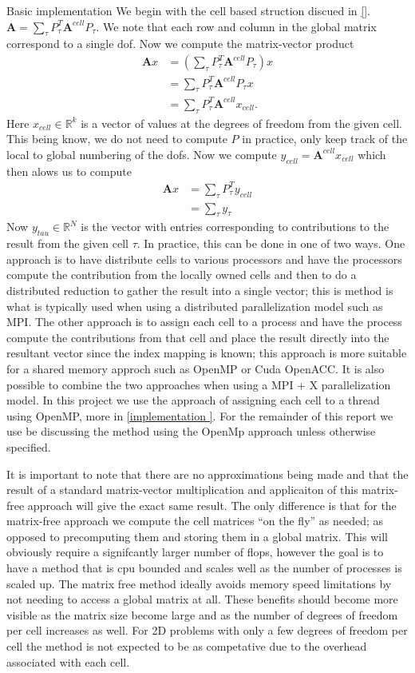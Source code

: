 \documentclass[12pt]{article}
\begin{document}
Basic implementation
We begin with the cell based struction discued in \ref{}. $ \mathbf{A} = \sum_{\tau}P^{T}_{\tau}\mathbf{A}^{cell}P_{\tau} $. We note that each row and column in the global matrix correspond to a single dof. Now we compute the matrix-vector product
\begin{align*}
\mathbf{A}x &= \left(\sum_{\tau}P^{T}_{\tau}\mathbf{A}^{cell}P_{\tau} \right)x \\
				&= \sum_{\tau}P^{T}_{\tau}\mathbf{A}^{cell}P_{\tau}x \\
				&= \sum_{\tau}P^{T}_{\tau}\mathbf{A}^{cell}x_{cell}.
\end{align*}
Here $x_{cell} \in \mathbb{R}^{k}$ is a vector of values at the degrees of freedom from the given cell. This being know, we do not need to compute $P$ in practice, only keep track of the local to global numbering of the dofs. Now we compute $y_{cell} = \mathbf{A}^{cell}x_{cell}$ which then alows us to compute
\begin{align*}
\mathbf{A}x &= \sum_{\tau}P^{T}_{\tau}y_{cell} \\
				&= \sum_{\tau} y_{\tau}
\end{align*}
Now $y_{tau} \in \mathbb{R}^{N}$ is the vector with entries corresponding to contributions to the result from the given cell $\tau$. In practice, this can be done in one of two ways. One approach is to have distribute cells to various processors and have the processors compute the contribution from the locally owned cells and then to do a distributed reduction to gather the result into a single vector; this is method is what is typically used when using a distributed parallelization model such as MPI. The other approach is to assign each cell to a process and have the process compute the contributions from that cell and place the result directly into the resultant vector since the index mapping is known; this approach is more suitable for a shared memory approch such as OpenMP or Cuda OpenACC. It is also possible to combine the two approaches when using a MPI + X parallelization model. In this project we use the approach of assigning each cell to a thread using OpenMP, more in \ref{implementation }. For the remainder of this report we use be discussing the method using the OpenMp approach unless otherwise specified.

It is important to note that there are no approximations being made and that the result of a standard matrix-vector multiplication and applicaiton of this matrix-free approach will give the exact same result. The only difference is that for the matrix-free approach we compute the cell matrices ``on the fly'' as needed; as opposed to precomputing them and storing them in a global matrix. This will obviously require a signifcantly larger number of flops, however the goal is to have a method that is cpu bounded and scales well as the number of processes is scaled up. The matrix free method ideally avoids memory speed limitations by not needing to access a global matrix at all. These benefits should become more visible as the matrix size become large and as the number of degrees of freedom per cell increases as well. For 2D problems with only a few degrees of freedom per cell the method is not expected to be as competative due to the overhead associated with each cell. 
\end{document}
